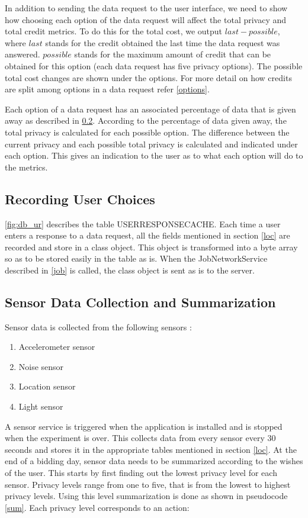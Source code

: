 In addition to sending the data request to the user interface, we need to show how choosing each option of the data request will affect the total privacy and total credit metrics. To do this for the total cost, we output $last-possible$, where $last$ stands for the credit obtained the last time the data request was answered. $possible$ stands for the maximum amount of credit that can be obtained for this option (each data request has five privacy options). The possible total cost changes are shown under the options. For more detail on how credits are split among options in a data request refer \ref{options}.

Each option of a data request has an associated percentage of data that is given away as described in \ref{}. According to the percentage of data given away, the total privacy is calculated for each possible option. The difference between the current privacy and each possible total privacy is calculated and indicated under each option. This gives an indication to the user as to what each option will do to the metrics.

\subsection{Recording User Choices}

\ref{fig:db_ur} describes the table USERRESPONSECACHE. Each time a user enters a response to a data request, all the fields mentioned in section
\ref{loc} are recorded and store in a class object. This object is transformed into a byte array so as to be stored easily in the table as is.
When the JobNetworkService described in \ref{job} is called, the class object is sent as is to the server.


\subsection{Sensor Data Collection and Summarization} 

Sensor data is collected from the following sensors :

\begin{enumerate}
	\item Accelerometer sensor
	\item Noise sensor
    \item Location sensor
    \item Light sensor
\end{enumerate}

A sensor service is triggered when the application is installed and is stopped when the experiment is over. This collects data from every sensor
every 30 seconds and stores it in the appropriate tables mentioned in section \ref{loc}.
At the end of a bidding day, sensor data needs to be summarized according to the wishes of the user. This starts by first finding out the lowest privacy level for each sensor. Privacy levels range from one to five, that is from the lowest to highest privacy levels. Using this level
summarization is done as shown in pseudocode \ref{sum}. Each privacy level corresponds to an action:

